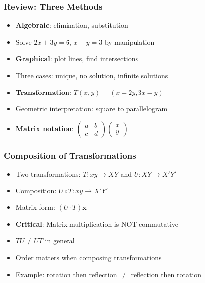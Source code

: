 \begin{frame}[fragile]\frametitle{Review: Three Methods}
  \begin{itemize}
    \item \textbf{Algebraic}: elimination, substitution
    \item Solve $2x + 3y = 6$, $x - y = 3$ by manipulation
    \item \textbf{Graphical}: plot lines, find intersections
    \item Three cases: unique, no solution, infinite solutions
    \item \textbf{Transformation}: $T(x,y) = (x+2y, 3x-y)$
    \item Geometric interpretation: square to parallelogram
    \item \textbf{Matrix notation}: $\begin{pmatrix} a & b \\ c & d \end{pmatrix} \begin{pmatrix} x \\ y \end{pmatrix}$
  \end{itemize}
\end{frame}

\begin{frame}[fragile]\frametitle{Composition of Transformations}
  \begin{itemize}
    \item Two transformations: $T: xy \to XY$ and $U: XY \to X'Y'$
    \item Composition: $U \circ T: xy \to X'Y'$
    \item Matrix form: $(U \cdot T) \mathbf{x}$
    \item \textbf{Critical}: Matrix multiplication is NOT commutative
    \item $TU \neq UT$ in general
    \item Order matters when composing transformations
    \item Example: rotation then reflection $\neq$ reflection then rotation
  \end{itemize}
\end{frame}

